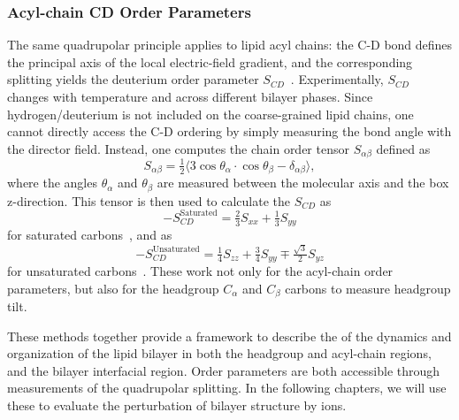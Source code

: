 \subsubsection{Acyl-chain CD Order Parameters}
The same quadrupolar principle applies to lipid acyl chains: the C-D bond defines the principal axis of the local electric-field gradient, and the corresponding splitting yields the deuterium order parameter $S_{CD}$~\cite{seelig:1977}.
Experimentally, $S_{CD}$ changes with temperature and across different bilayer phases. 
Since hydrogen/deuterium is not included on the coarse-grained lipid chains, one cannot directly access the C-D ordering by simply measuring the bond angle with the director field. 
Instead, one computes the chain order tensor $S_{\alpha\beta}$ defined as
\begin{equation}
    S_{\alpha\beta}=\tfrac{1}{2}\big\langle
    3\cos{\theta_\alpha}\cdot\cos{\theta_\beta}-\delta_{\alpha\beta}\big\rangle,
    \nonumber
\end{equation}
where the angles $\theta_\alpha$ and $\theta_\beta$ are measured between the molecular axis and the box z-direction. 
This tensor is then used to calculate the $S_{CD}$ as
\begin{equation}
    -S_{CD}^{\text{Saturated}}=\tfrac{2}{3}S_{xx}+\tfrac{1}{3}S_{yy}
\end{equation}
for saturated carbons~\cite{egberts:1988}, and as
\begin{equation}
    -S_{CD}^{\text{Unsaturated}}=\tfrac{1}{4}S_{zz}+\tfrac{3}{4}S_{yy}\mp \tfrac{\sqrt{3}}{2}S_{yz}
\end{equation}
for unsaturated carbons~\cite{Douliez:1995}. These work not only for the acyl-chain order parameters,
but also for the headgroup $C_\alpha$ and $C_\beta$ carbons to measure headgroup tilt. 

These methods together provide a framework to describe the of 
the dynamics and organization of the lipid bilayer in both the headgroup and acyl-chain regions, and the 
bilayer interfacial region. Order parameters are both accessible through measurements of 
the quadrupolar splitting. In the following chapters, we will use these to evaluate the perturbation 
of bilayer 
structure by ions.
